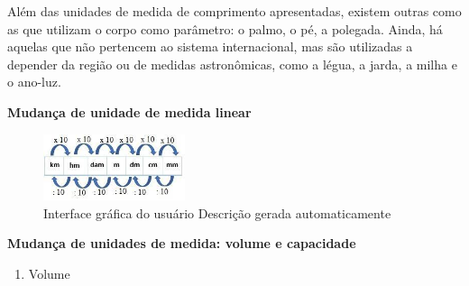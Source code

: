 \begin{escolha}
\begin{boxmedio}
\begin{boxmedio}
{\begin{boxpeq}
\begin{boxpeq}
{\begin{boxpeq}
\begin{boxmedio}
\begin{boxmedio}
\begin{boxpeq}
\begin{boxmedio}
\begin{boxpeq}
\begin{boxpeq}
\begin{boxpeq}
\begin{boxpeq}
\begin{boxmedio}
{\begin{boxmedio}
\begin{boxmedio}
\begin{boxpeq}
\begin{boxmedio}
\begin{boxpeq}
\begin{boxpeq}
\begin{boxpeq}
\begin{escolha}
{\begin{boxmedio}
\begin{boxpeq}
\begin{boxpeq}
\begin{boxpeq}
\begin{boxpeq}
\begin{boxpeq}
\begin{boxmedio}
\begin{boxpeq}
\begin{boxpeq}
\begin{boxpeq}
{\begin{boxpeq}
\begin{boxmedio}
\begin{boxpeq}
\begin{boxpeq}
\begin{boxpeq}
{\begin{boxpeq}
\begin{boxmedio}
{\begin{boxpeq}
\begin{boxpeq}
\begin{boxmedio}
\begin{boxmedio}
\begin{boxpeq}
\begin{boxpeq}
{\begin{boxpeq}
\begin{boxpeq}
\begin{boxpeq}
\begin{boxpeq}
\begin{boxpeq}
\begin{escolha}
\begin{escolha}
{\begin{boxmedio}
\begin{boxpeq}
\begin{q°}
\begin{boxmedio}
\begin{boxpeq}
\begin{boxpeq}
\begin{boxmedio}
\begin{boxmedio}
\begin{boxmedio}
\begin{boxmedio}
{Além das unidades de medida de comprimento apresentadas, existem outras
como as que utilizam o corpo como parâmetro: o palmo, o pé, a polegada.
Ainda, há aquelas que não pertencem ao sistema internacional, mas são
utilizadas a depender da região ou de medidas astronômicas, como a
légua, a jarda, a milha e o ano-luz.

\textbf{Mudança de unidade de medida linear}

\begin{figure}
\centering
\includegraphics[width=1.63366in,height=0.76567in]{./_SAEB_9_MAT/media/image227.jpeg}
\caption{Interface gráfica do usuário Descrição gerada automaticamente}
\end{figure}


\textbf{Mudança de unidades de medida: volume e capacidade}

\begin{enumerate}

  \item Volume


\end{enumerate}}
\end{boxmedio}
\end{boxmedio}
\end{boxmedio}
\end{boxmedio}
\end{boxpeq}
\end{boxpeq}
\end{boxmedio}
\end{q°}
\end{boxpeq}
\end{boxmedio}}
\end{escolha}
\end{escolha}
\end{boxpeq}
\end{boxpeq}
\end{boxpeq}
\end{boxpeq}
\end{boxpeq}}
\end{boxpeq}
\end{boxpeq}
\end{boxmedio}
\end{boxmedio}
\end{boxpeq}
\end{boxpeq}}
\end{boxmedio}
\end{boxpeq}}
\end{boxpeq}
\end{boxpeq}
\end{boxpeq}
\end{boxmedio}
\end{boxpeq}}
\end{boxpeq}
\end{boxpeq}
\end{boxpeq}
\end{boxmedio}
\end{boxpeq}
\end{boxpeq}
\end{boxpeq}
\end{boxpeq}
\end{boxpeq}
\end{boxmedio}}
\end{escolha}
\end{boxpeq}
\end{boxpeq}
\end{boxpeq}
\end{boxmedio}
\end{boxpeq}
\end{boxmedio}
\end{boxmedio}}
\end{boxmedio}
\end{boxpeq}
\end{boxpeq}
\end{boxpeq}
\end{boxpeq}
\end{boxmedio}
\end{boxpeq}
\end{boxmedio}
\end{boxmedio}
\end{boxpeq}}
\end{boxpeq}
\end{boxpeq}}
\end{boxmedio}
\end{boxmedio}
\end{escolha}
